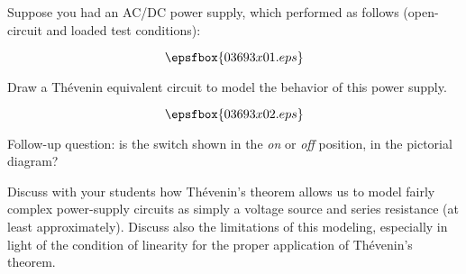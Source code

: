 

Suppose you had an AC/DC power supply, which performed as follows (open-circuit and loaded test conditions):

$$\epsfbox{03693x01.eps}$$

Draw a Th\'evenin equivalent circuit to model the behavior of this power supply.







$$\epsfbox{03693x02.eps}$$

\vskip 10pt

Follow-up question: is the switch shown in the {\it on} or {\it off} position, in the pictorial diagram?







Discuss with your students how Th\'evenin's theorem allows us to model fairly complex power-supply circuits as simply a voltage source and series resistance (at least approximately).  Discuss also the limitations of this modeling, especially in light of the condition of linearity for the proper application of Th\'evenin's theorem.




